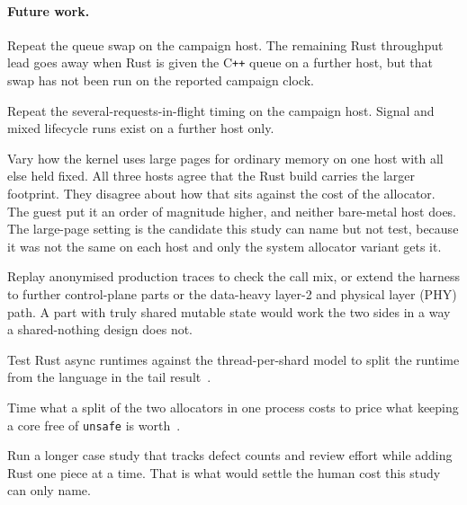 \documentclass[english,oneside,a4paper,censored,csm,software-track-2020]{HYthesisML}
\begin{document}
\paragraph{Future work.}
\begin{compactitem}
\item Repeat the queue swap on the campaign host. The remaining Rust throughput lead goes away
when Rust is given the C\texttt{++} queue on a further host, but that swap has not been run on
the reported campaign clock.

\item Repeat the several-requests-in-flight timing on the campaign host. Signal and mixed
lifecycle runs exist on a further host only.

\item Vary how the kernel uses large pages for ordinary memory on one host with all else held
fixed. All three hosts agree that the Rust build carries the larger footprint. They disagree
about how that sits against the cost of the allocator. The guest put it an order of magnitude
higher, and neither bare-metal host does. The large-page setting is the candidate this study
can name but not test, because it was not the same on each host and only the system allocator
variant gets it.

\item Replay anonymised production traces to check the call mix, or extend the harness to further
control-plane parts or the data-heavy layer-2 and physical layer (PHY) path. A part with truly
shared mutable state would work the two sides in a way a shared-nothing design does not.

\item Test Rust async runtimes against the thread-per-shard model to split the runtime from the
language in the tail result~\cite{arvidsson2025async}.

\item Time what a split of the two allocators in one process costs to price what keeping a core
free of \texttt{unsafe} is worth~\cite{rivera2021galeed,kirth2022pkrusafe}.

\item Run a longer case study that tracks defect counts and review effort while adding Rust one
piece at a time. That is what would settle the human cost this study can only name.
\end{compactitem}


\end{document}
